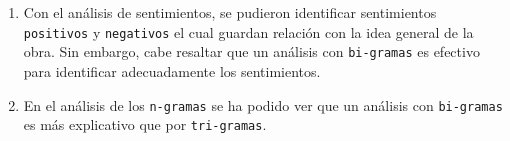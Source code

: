 \documentclass[article,30pt,extrafontsizes]{memoir}
\begin{document}
\begin{multicols*}{3}
{\begin{enumerate}
\def\labelenumi{\arabic{enumi}.}
\item
  Con el análisis de sentimientos, se pudieron identificar sentimientos \texttt{\colorbox{tio}{\textcolor{titleboxbgcol}{positivos}}} y \texttt{\colorbox{tio}{\textcolor{titleboxbgcol}{negativos}}} el cual guardan relación con la idea general de la obra. Sin embargo, cabe resaltar que un análisis con \texttt{bi-gramas} es efectivo para identificar adecuadamente los sentimientos.
\item
  En el análisis de los \texttt{n-gramas} se ha podido ver que un
  análisis con \texttt{bi-gramas} es más explicativo que por \texttt{tri-gramas}.
\end{enumerate}
}

\printbibliography
\end{multicols*}
\end{document}
